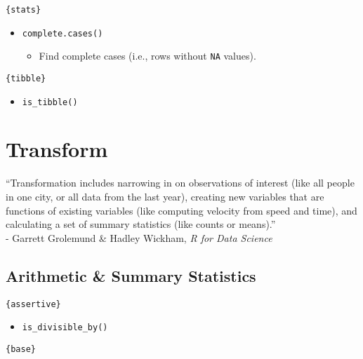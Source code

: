 \documentclass[
]{book}
\providecommand{\tightlist}{%
  \setlength{\itemsep}{0pt}\setlength{\parskip}{0pt}}
\begin{document}
\texttt{\{stats\}}

\begin{itemize}
\tightlist
\item
  \texttt{complete.cases()}

  \begin{itemize}
  \tightlist
  \item
    Find complete cases (i.e., rows without \texttt{NA} values).
  \end{itemize}
\end{itemize}

\texttt{\{tibble\}}

\begin{itemize}
\tightlist
\item
  \texttt{is\_tibble()}
\end{itemize}

\hypertarget{transform}{%
\chapter{Transform}\label{transform}}

``Transformation includes narrowing in on observations of interest (like all people in one city, or all data from the last year), creating new variables that are functions of existing variables (like computing velocity from speed and time), and calculating a set of summary statistics (like counts or means).''\\
- Garrett Grolemund \& Hadley Wickham, \emph{R for Data Science}

\hypertarget{arithmetic-summary-statistics}{%
\section{Arithmetic \& Summary Statistics}\label{arithmetic-summary-statistics}}

\texttt{\{assertive\}}

\begin{itemize}
\tightlist
\item
  \texttt{is\_divisible\_by()}
\end{itemize}

\texttt{\{base\}}
\end{document}
